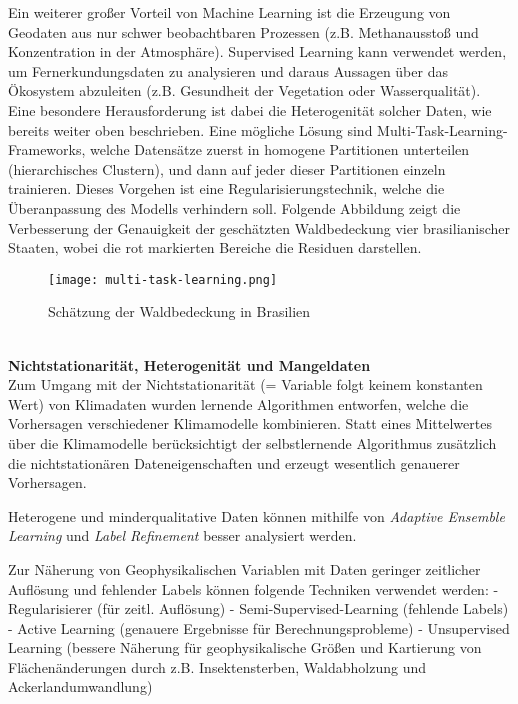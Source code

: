 \documentclass[11pt,fleqn]{book}
\begin{document}
\bigskip
Ein weiterer großer Vorteil von Machine Learning ist die Erzeugung von Geodaten aus nur schwer beobachtbaren Prozessen (z.B. Methanausstoß und Konzentration in der Atmosphäre). Supervised Learning kann verwendet werden, um Fernerkundungsdaten zu analysieren und daraus Aussagen über das Ökosystem abzuleiten (z.B. Gesundheit der Vegetation oder Wasserqualität). Eine besondere Herausforderung ist dabei die Heterogenität solcher Daten, wie bereits weiter oben beschrieben. Eine mögliche Lösung sind Multi-Task-Learning-Frameworks, welche Datensätze zuerst in homogene Partitionen unterteilen (hierarchisches Clustern), und dann auf jeder dieser Partitionen einzeln trainieren. Dieses Vorgehen ist eine Regularisierungstechnik, welche die Überanpassung des Modells verhindern soll. Folgende Abbildung zeigt die Verbesserung der Genauigkeit der geschätzten Waldbedeckung vier brasilianischer Staaten, wobei die rot markierten Bereiche die Residuen darstellen.
\begin{figure}[h]
\centering
\texttt{[image: multi-task-learning.png]}
\caption{Schätzung der Waldbedeckung in Brasilien \protect\footnotemark}
\end{figure}
\\
\bigskip
\textbf{Nichtstationarität, Heterogenität und Mangeldaten}\\
Zum Umgang mit der Nichtstationarität (= Variable folgt keinem konstanten Wert) von Klimadaten wurden lernende Algorithmen entworfen, welche die Vorhersagen verschiedener Klimamodelle kombinieren. Statt eines Mittelwertes über die Klimamodelle berücksichtigt der selbstlernende Algorithmus zusätzlich  die nichtstationären Dateneigenschaften und erzeugt wesentlich genauerer Vorhersagen.

Heterogene und minderqualitative Daten können mithilfe von \textit{Adaptive Ensemble Learning} und \textit{Label Refinement} besser analysiert werden.

Zur Näherung von Geophysikalischen Variablen mit Daten geringer zeitlicher Auflösung und fehlender Labels können folgende Techniken verwendet werden:
- Regularisierer (für zeitl. Auflösung)
- Semi-Supervised-Learning (fehlende Labels)
- Active Learning (genauere Ergebnisse für Berechnungsprobleme)
- Unsupervised Learning (bessere Näherung für geophysikalische Größen und Kartierung von Flächenänderungen durch z.B. Insektensterben, Waldabholzung und Ackerlandumwandlung)\\
\end{document}

